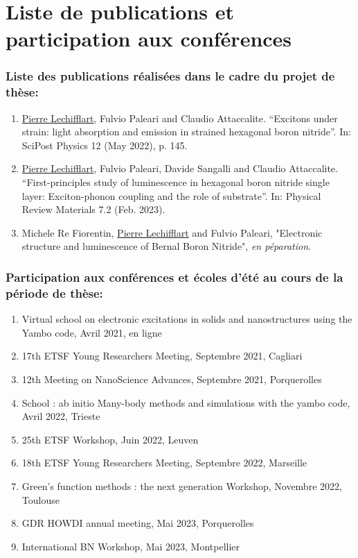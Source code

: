 \newpage
\chapter*{Liste de publications et participation aux conférences}
\subsection*{Liste des publications réalisées dans le cadre du projet de thèse:}
\begin{enumerate}
\item \underline{Pierre Lechifflart}, Fulvio Paleari and Claudio Attaccalite. “Excitons under strain: light absorption and emission in strained
hexagonal boron nitride”. In: SciPost Physics 12 (May 2022), p. 145.
\item \underline{Pierre Lechifflart}, Fulvio Paleari, Davide Sangalli and Claudio Attaccalite. “First-principles study of luminescence in hexagonal boron
nitride single layer: Exciton-phonon coupling and the role of substrate”. In: Physical Review Materials 7.2 (Feb. 2023).
\item Michele Re Fiorentin, \underline{Pierre Lechifflart} and Fulvio Paleari, "Electronic structure and luminescence of Bernal Boron Nitride", \textit{en péparation}.
\end{enumerate}


\subsection*{Participation aux conférences et écoles d’été au cours de la période de thèse:}
\begin{enumerate}
\item Virtual school on electronic excitations in solids and nanostructures using the Yambo code, Avril 2021, en ligne
\item 17th ETSF Young Researchers Meeting, Septembre 2021, Cagliari
\item 12th Meeting on NanoScience Advances, Septembre 2021, Porquerolles
\item School : ab initio Many-body methods and simulations with the yambo code, Avril 2022, Trieste  
\item 25th ETSF Workshop, Juin 2022, Leuven
\item 18th ETSF Young Researchers Meeting, Septembre 2022, Marseille
\item Green's function methods : the next generation Workshop, Novembre 2022, Toulouse
\item GDR HOWDI annual meeting, Mai 2023, Porquerolles
\item International BN Workshop, Mai 2023, Montpellier
\end{enumerate}